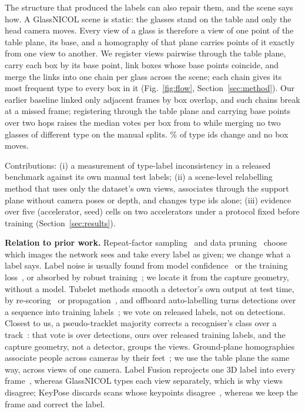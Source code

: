 \documentclass{article}
\begin{document}
The structure that produced the labels can also repair them, and the scene says how. A GlassNICOL scene is static: the glasses stand on the table and only the head camera moves. Every view of a glass is therefore a view of one point of the table plane, its base, and a homography of that plane carries points of it exactly from one view to another. We register views pairwise through the table plane, carry each box by its base point, link boxes whose base points coincide, and merge the links into one chain per glass across the scene; each chain gives its most frequent type to every box in it (Fig.~\ref{fig:flow}, Section~\ref{sec:method}). Our earlier baseline linked only adjacent frames by box overlap, and such chains break at a missed frame; registering through the table plane and carrying base points over two hops raises the median votes per box from \TrkMedianVotes{} to \SceneMedianLen{} while merging no two glasses of different type on the manual splits. \SceneChangedPct\% of type ids change and no box moves.

Contributions: (i) a measurement of type-label inconsistency in a released benchmark against its own manual test labels; (ii) a scene-level relabelling method that uses only the dataset's own views, associates through the support plane without camera poses or depth, and changes type ids alone; (iii) evidence over five (accelerator, seed) cells on two accelerators under a protocol fixed before training (Section~\ref{sec:results}).

\noindent\textbf{Relation to prior work.} Repeat-factor sampling~\cite{gupta2019lvis} and data pruning~\cite{paul2021datadiet,sorscher2022pruning} choose which images the network sees and take every label as given; we change what a label says. Label noise is usually found from model confidence~\cite{northcutt2021confident,northcutt2021errors} or the training loss~\cite{schubert2024labelerrors}, or absorbed by robust training~\cite{song2023noisysurvey,liu2022nlte}; we locate it from the capture geometry, without a model. Tubelet methods smooth a detector's own output at test time, by re-scoring~\cite{kang2016tcnn,han2016seqnms} or propagation~\cite{tripathi2016propagation}, and offboard auto-labelling turns detections over a sequence into training labels~\cite{qi2021offboard}; we vote on released labels, not on detections. Closest to us, a pseudo-tracklet majority corrects a recogniser's class over a track~\cite{chen2016pseudotracklet}: that vote is over detections, ours over released training labels, and the capture geometry, not a detector, groups the views. Ground-plane homographies associate people across cameras by their feet~\cite{khan2006homography}; we use the table plane the same way, across views of one camera. Label Fusion reprojects one 3D label into every frame~\cite{marion2018labelfusion}, whereas GlassNICOL types each view separately, which is why views disagree; KeyPose discards scans whose keypoints disagree~\cite{liu2020keypose}, whereas we keep the frame and correct the label.
\end{document}
